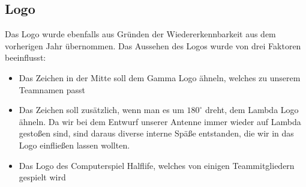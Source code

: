 \subsection{Logo}
Das Logo wurde ebenfalls aus Gründen der Wiedererkennbarkeit aus dem vorherigen Jahr übernommen. Das Aussehen des Logos wurde von drei Faktoren beeinflusst:
\begin{itemize}
	\item Das Zeichen in der Mitte soll dem Gamma Logo ähneln, welches zu unserem Teamnamen passt
	\item Das Zeichen soll zusätzlich, wenn man es um $180^\circ$ dreht, dem Lambda Logo ähneln. Da wir bei dem Entwurf unserer Antenne immer wieder auf Lambda gestoßen sind, sind daraus diverse interne Späße entstanden, die wir in das Logo einfließen lassen wollten.
	\item Das Logo des Computerspiel Halflife, welches von einigen Teammitgliedern gespielt wird
\end{itemize}